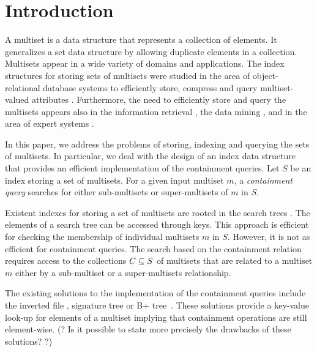 \section{Introduction} \label{c:introduction}
%
%
A multiset is a data structure that represents a collection of elements. It generalizes a set data structure by allowing duplicate elements in a collection. Multisets appear in a wide variety of domains and applications. The index structures for storing sets of multisets were studied in the area of object-relational database systems to efficiently store, compress and query multiset-valued attributes \cite{bouros2016set,gripon2012compressing,ross2004symmetric,steinruecken2015compressing}. Furthermore, the need to efficiently store and query the multisets appears also in the information retrieval \cite{manningBook}, the data mining \cite{interestingSets}, and in the area of expert systems \cite{reteAlgorithm}. 
%

In this paper, we address the problems of storing, indexing and querying the sets of multisets. In particular, we deal with the design of an index data structure that provides an efficient implementation of the containment queries. Let $S$ be an index storing a set of multisets. For a given input multiset $m$, a \emph{containment query} searches for either sub-multisets or super-multisets of $m$ in $S$. 

Existent indexes for storing a set of multisets are rooted in the search trees \cite{rivestBook}. The elements of a search tree can be accessed through keys. This approach is efficient for checking the membership of individual multisets $m$ in $S$. However, it is not as efficient for  containment queries. The search based on the containment relation requires access to the collections $C\subseteq\/S$ of multisets that are related to a multiset $m$ either by a sub-multiset or a super-multisets relationship. 

The existing solutions to the implementation of the containment queries include the inverted file \cite{manningBook}, signature tree \cite{} or B+ tree~\cite{Helmer2003}. These solutions provide a key-value look-up for elements of a multiset implying that containment operations are still element-wise. (? Is it possible to state more precisely the drawbacks of these solutions? ?) 

